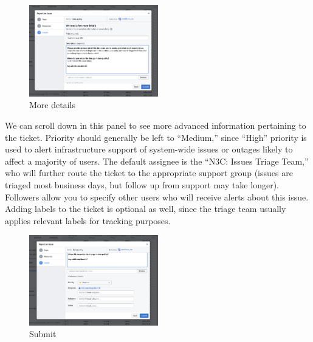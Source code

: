 \documentclass[
  letterpaper,
  DIV=11,
  numbers=noendperiod]{scrreprt}
\begin{document}
\begin{figure}

{\centering \includegraphics[width=0.5\textwidth,height=\textheight]{chapters/images/support/image-06-issue-more-details.png}

}

\caption{\label{fig-support-issue-more-details}More details}

\end{figure}

We can scroll down in this panel to see more advanced information
pertaining to the ticket. Priority should generally be left to
``Medium,'' since ``High'' priority is used to alert infrastructure
support of system-wide issues or outages likely to affect a majority of
users. The default assignee is the ``N3C: Issues Triage Team,'' who will
further route the ticket to the appropriate support group (issues are
triaged most business days, but follow up from support may take longer).
Followers allow you to specify other users who will receive alerts about
this issue. Adding labels to the ticket is optional as well, since the
triage team usually applies relevant labels for tracking purposes.

\begin{figure}

{\centering \includegraphics[width=0.5\textwidth,height=\textheight]{chapters/images/support/image-07-issue-submit.png}

}

\caption{\label{fig-support-issue-submit}Submit}

\end{figure}
\end{document}
